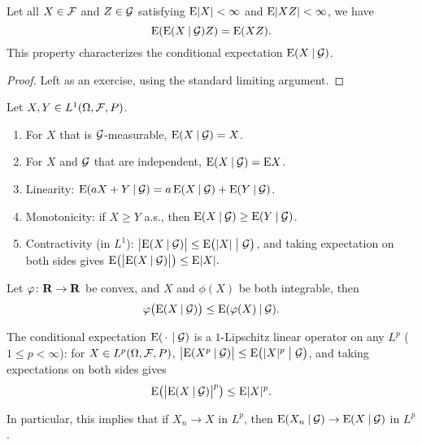 
\begin{fact} \label{fact:char-property-CE}
    Let all $X \in \F$ and $Z \in \G$ satisfying $\E \abs{X} < \infty$ and $\E\abs{X Z} < \infty$, we have \[
        \E(\E(X \giv \G) Z) = \E(X Z).
    \] This property characterizes the conditional expectation $\E(X \giv \G)$.  %
\end{fact}
\begin{proof}
    Left as an exercise, using the standard limiting argument.
\end{proof}

\begin{prop} Let $X,Y \in L^1(\Omega,\F,P)$.
    \begin{enumerate}
        \item For $X$ that is $\G$-measurable, $\E(X \giv \G) = X$.
        \item For $X$ and $\G$ that are independent, $\E(X \giv \G) = \E X$.
        \item Linearity: $\E(aX + Y \giv \G) = a\E(X \giv \G) + \E(Y\giv \G)$.
        \item Monotonicity: if $X \geq Y$ a.s., then $\E(X \giv \G) \geq \E(Y \giv \G)$.
        \item Contractivity (in $L^1$): $\bigl\vert \E(X \giv \G)\bigr\vert \leq \E\bigl(\abs{X} \bigm\vert \G\bigr)$, and taking expectation on both sides gives $\E\bigl(\bigl\vert\E(X \giv \G)\bigr\vert\bigr) \leq \E \abs{X}.$
    \end{enumerate}
\end{prop}

\begin{namedthm} \label{thm:cond-Jensen}
    Let $\phi\colon \R \to \R$ be convex, and $X$ and $\phi(X)$ be both integrable, then \[
        \phi\bigl(\E (X\giv \G)\bigr) \leq \E (\phi(X) \giv \G).
    \]
\end{namedthm}

\begin{cor} \label{cor:CE-contraction}
    The conditional expectation $\E(\blank \giv \G)$ is a $1$-Lipschitz linear operator on any $L^p$ ($1 \leq p < \infty$): for $X \in L^p(\Omega,\F,P)$, $\bigl\vert \E(X^p \giv \G)\bigr\vert \leq \E\bigl(\abs{X}^p \bigm\vert \G\bigr)$, and taking expectations on both sides gives
        \[
            \E\bigl(\bigl\vert\E(X \giv \G)\bigr\vert^p\bigr) \leq \E \abs{X}^p.
        \]

    In particular, this implies that if $X_n \to X$ in $L^p$, then $\E(X_n \giv \G) \to \E(X\giv \G)$ in $L^p$.
\end{cor}

